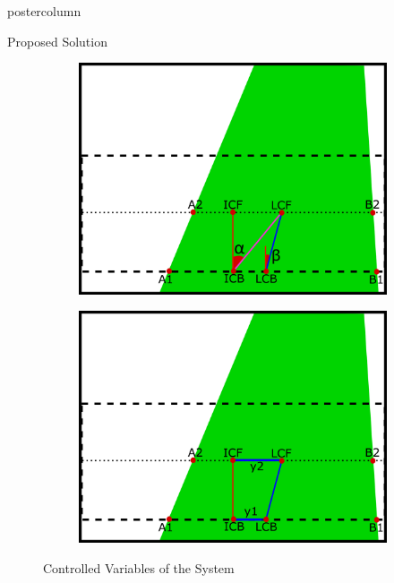 \documentclass{beamer}
\begin{document}
\begin{frame}
\begin{columns}
\begin{column}{.5\textwidth}
\begin{beamercolorbox}[center]{postercolumn}
\begin{minipage}{.98\textwidth}
{\begin{myblock}{Proposed Solution}
		\begin{figure}[H]
			\centering
			\begin{subfigure}{.36\textwidth}
				\centering
				\includegraphics[width=.85\textwidth]{img/ang_cont}
			\end{subfigure}%
			\begin{subfigure}{.36\textwidth}
				\centering
				\includegraphics[width=.85\textwidth]{img/dist_cont}
			\end{subfigure}
			\caption{\label{fig:controlled-vars} Controlled Variables of the System }
			\-\vspace{-2.01cm}
		\end{figure}
		
	\end{myblock}	

}
\end{minipage}
\end{beamercolorbox}
\end{column}
\end{columns}
\end{frame}
\end{document}
